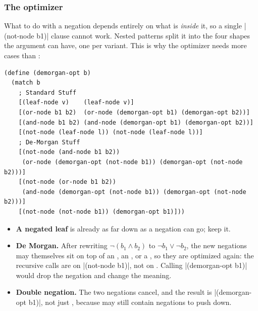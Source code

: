\subsubsection{The optimizer} What to do with a negation depends entirely on what is \emph{inside} it, so a single \rkt|(not-node b1)| clause cannot work. Nested patterns split it into the four shapes the argument can have, one per variant. This is why the optimizer needs more cases than :
\begin{lstlisting}
(define (demorgan-opt b)
  (match b
    ; Standard Stuff
    [(leaf-node v)    (leaf-node v)]
    [(or-node b1 b2)  (or-node (demorgan-opt b1) (demorgan-opt b2))]
    [(and-node b1 b2) (and-node (demorgan-opt b1) (demorgan-opt b2))]
    [(not-node (leaf-node l)) (not-node (leaf-node l))]
    ; De-Morgan Stuff
    [(not-node (and-node b1 b2))
     (or-node (demorgan-opt (not-node b1)) (demorgan-opt (not-node b2)))]
    [(not-node (or-node b1 b2))
     (and-node (demorgan-opt (not-node b1)) (demorgan-opt (not-node b2)))]
    [(not-node (not-node b1)) (demorgan-opt b1)]))
\end{lstlisting}
\begin{itemize}
  \item \textbf{A negated leaf} is already as far down as a negation can go; keep it.
  \item \textbf{De Morgan.} After rewriting $\neg(b_1 \land b_2)$ to $\neg b_1 \lor \neg b_2$, the new negations may themselves sit on top of an , an , or a , so they are optimized again: the recursive calls are on \rkt|(not-node b1)|, not on . Calling \rkt|(demorgan-opt b1)| would drop the negation and change the meaning.
  \item \textbf{Double negation.} The two negations cancel, and the result is \rkt|(demorgan-opt b1)|, not just , because  may still contain negations to push down.
\end{itemize}

